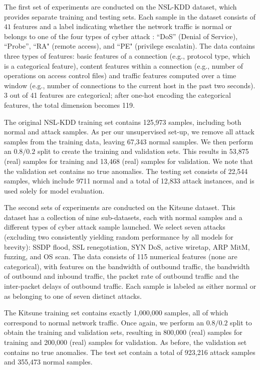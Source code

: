 \documentclass{article}
\begin{document}
The first set of experiments are conducted on the NSL-KDD dataset, which provides separate training and testing sets. Each sample in the dataset consists of $41$ features and a label indicating whether the network traffic is normal or belongs to one of the four types of cyber attack : “DoS” (Denial of Service), “Probe”,  “RA" (remote access), and “PE" (privilege escalatin). 
The data contains three types of features: basic features of a connection (e.g., protocol type, which is a categorical feature), content features within a connection (e.g., number of operations on access control files) and traffic features computed over a time window (e.g., number of connections to the current host in the past two seconds).
3 out of 41 features are categorical; after one-hot encoding the categorical features, the total dimension becomes 119.

The original NSL-KDD training set contains 125,973 samples, including both normal and attack samples. As per our unsupervised set-up, we remove all attack samples from the training data, leaving 67,343 normal samples. We then perform an $0.8/0.2$ split to create the training and validation sets. This results in 53,875 (real) samples for training and 13,468 (real) samples for validation. We note that the validation set contains no true anomalies.
The testing set consists of 22,544 samples, which include 9711 normal and a total of 12,833 attack instances, and is used solely for model evaluation. 



The second sets of experiments are conducted on the Kitsune dataset. This dataset has a collection of nine sub-datasets, each with normal samples and a different types of cyber attack sample launched.
We select seven attacks (excluding two consistently yielding random performance by all models for brevity): SSDP flood, SSL renegotiation, SYN DoS, active wiretap, ARP MitM, fuzzing, and OS scan.
The data consists of 115 numerical features (none are categorical), with features on the bandwidth of outbound traffic, the bandwidth of outbound and inbound traffic, the packet rate of outbound traffic and the inter-packet delays of outbound traffic.
Each sample is labeled as either normal or as belonging to one of seven distinct attacks.

The Kitsune training set contains exactly 1,000,000 samples, all of which correspond to normal network traffic. Once again, we perform an $0.8/0.2$ split to obtain the training and validation sets, resulting in 800,000 (real) samples for training and 200,000 (real) samples for validation. As before, the validation set contains no true anomalies.
The test set contain a total of 923,216 attack samples and 355,473 normal samples.
\end{document}
